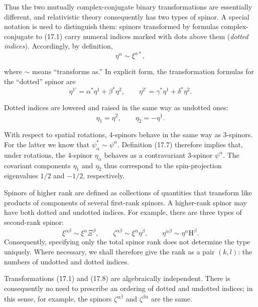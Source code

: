 Thus the two mutually complex-conjugate binary transformations are essentially different, and relativistic theory consequently has two types of spinor. A special notation is used to distinguish them: spinors transformed by formulas complex-conjugate to (17.1) carry numeral indices marked with dots above them (\emph{dotted indices}). Accordingly, by definition,
\begin{equation}
\eta^{\dot\alpha}\sim\xi^{\alpha*},
\tag{17.7}
\end{equation}

where $\sim$ means ``transforms as.'' In explicit form, the transformation formulas for the ``dotted'' spinor are
\begin{equation}
\eta^{\dot1'}=\alpha^*\eta^{\dot1}+\beta^*\eta^{\dot2},\qquad
\eta^{\dot2'}=\gamma^*\eta^{\dot1}+\delta^*\eta^{\dot2}.
\tag{17.8}
\end{equation}

Dotted indices are lowered and raised in the same way as undotted ones:
\begin{equation}
\eta_{\dot1}=\eta^{\dot2},\qquad \eta_{\dot2}=-\eta^{\dot1}.
\tag{17.9}
\end{equation}

With respect to spatial rotations, 4-spinors behave in the same way as 3-spinors. For the latter we know that $\psi_\alpha^*\sim\psi^\alpha$. Definition (17.7) therefore implies that, under rotations, the 4-spinor $\eta_{\dot\alpha}$ behaves as a contravariant 3-spinor $\psi^\alpha$. The covariant components $\eta_{\dot1}$ and $\eta_{\dot2}$ thus correspond to the spin-projection eigenvalues $1/2$ and $-1/2$, respectively.

Spinors of higher rank are defined as collections of quantities that transform like products of components of several first-rank spinors. A higher-rank spinor may have both dotted and undotted indices. For example, there are three types of second-rank spinor:
\[
\xi^{\alpha\beta}\sim\xi^\alpha\Xi^\beta,
\qquad
\zeta^{\alpha\dot\beta}\sim\xi^\alpha\eta^{\dot\beta},
\qquad
\eta^{\dot\alpha\dot\beta}\sim\eta^{\dot\alpha}\mathrm H^{\dot\beta}.
\]
Consequently, specifying only the total spinor rank does not determine the type uniquely. Where necessary, we shall therefore give the rank as a pair $(k,l)$: the numbers of undotted and dotted indices.

Transformations (17.1) and (17.8) are algebraically independent. There is consequently no need to prescribe an ordering of dotted and undotted indices; in this sense, for example, the spinors $\zeta^{\alpha\dot\beta}$ and $\zeta^{\dot\beta\alpha}$ are the same.

